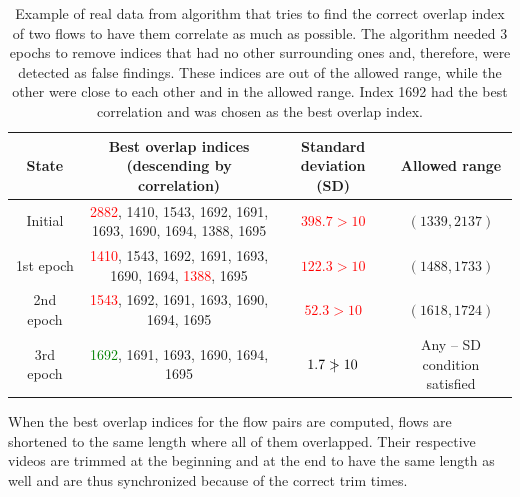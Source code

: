 \begin{table}[!ht]
    \begin{center}
        \begin{tabular}{ |c|c|c|c| }
            \hline
            State & \makecell{Best overlap indices \\ (descending by correlation)} & \makecell{Standard \\ deviation (SD)} & Allowed range \\
            \hline
            \hline
                Initial & \makecell{\textcolor{red}{2882}, 1410, 1543, 1692, 1691,\\1693, 1690, 1694, 1388, 1695} & \textcolor{red}{$398.7 > 10$} & $(1339, 2137)$ \\
            \hline
                1st epoch & \makecell{\textcolor{red}{1410}, 1543, 1692, 1691, 1693,\\1690, 1694, \textcolor{red}{1388}, 1695} & \textcolor{red}{$122.3 > 10$} & $(1488, 1733)$ \\
            \hline
                2nd epoch & \makecell{\textcolor{red}{1543}, 1692, 1691, 1693, 1690,\\1694, 1695} & \textcolor{red}{$52.3 > 10$} & $(1618, 1724)$ \\
            \hline
                3rd epoch & \makecell{\textcolor{green}{1692}, 1691, 1693, 1690, 1694,\\1695} & \textcolor{green}{$1.7 \mathrel{\ooalign{$>$\cr\hidewidth$|$\hidewidth}} 10$} & \makecell{Any -- SD \\ condition satisfied} \\
            \hline
        \end{tabular}
    \end{center}
    \caption{Example of real data from algorithm that tries to find the correct overlap index of two flows to have them correlate as much as possible. The algorithm needed 3 epochs to remove indices that had no other surrounding ones and, therefore, were detected as false findings. These indices are out of the allowed range, while the other were close to each other and in the allowed range. Index 1692 had the best correlation and was chosen as the best overlap index.}
    \label{tab:correlation-pick}
\end{table}

When the best overlap indices for the flow pairs are computed, flows are shortened to the same length where all of them overlapped. Their respective videos are trimmed at the beginning and at the end to have the same length as well and are thus synchronized because of the correct trim times.

